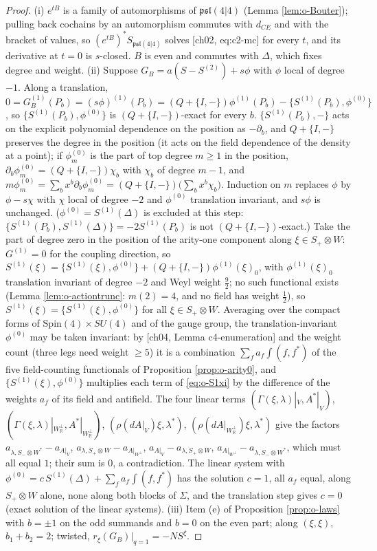 \begin{proof}
(i) $e^{tB}$ is a family of automorphisms of $\mathfrak{psl}(4|4)$ (Lemma \ref{lem:o-Bouter}); pulling back cochains by an automorphism commutes with $d_{CE}$ and with the bracket of values, so $(e^{tB})^*S_{\mathfrak{psl}(4|4)}$ solves [ch02, eq:c2-mc] for every $t$, and its derivative at $t=0$ is $s$-closed. $B$ is even and commutes with $\Delta$, which fixes degree and weight. (ii) Suppose $G_B=a(S-S^{(2)})+s\phi$ with $\phi$ local of degree $-1$. Along a translation, $0=G_B^{(1)}(P_b)=(s\phi)^{(1)}(P_b)=(Q+\{I,-\})\phi^{(1)}(P_b)-\{S^{(1)}(P_b),\phi^{(0)}\}$, so $\{S^{(1)}(P_b),\phi^{(0)}\}$ is $(Q+\{I,-\})$-exact for every $b$. $\{S^{(1)}(P_b),-\}$ acts on the explicit polynomial dependence on the position as $-\partial_b$, and $Q+\{I,-\}$ preserves the degree in the position (it acts on the field dependence of the density at a point); if $\phi^{(0)}_m$ is the part of top degree $m\ge1$ in the position, $\partial_b\phi^{(0)}_m=(Q+\{I,-\})\chi_b$ with $\chi_b$ of degree $m-1$, and $m\phi^{(0)}_m=\sum_bx^b\partial_b\phi^{(0)}_m=(Q+\{I,-\})\big(\sum_bx^b\chi_b\big)$. Induction on $m$ replaces $\phi$ by $\phi-s\chi$ with $\chi$ local of degree $-2$ and $\phi^{(0)}$ translation invariant, and $s\phi$ is unchanged. ($\phi^{(0)}=S^{(1)}(\Delta)$ is excluded at this step: $\{S^{(1)}(P_b),S^{(1)}(\Delta)\}=-2S^{(1)}(P_b)$ is not $(Q+\{I,-\})$-exact.) Take the part of degree zero in the position of the arity-one component along $\xi\in S_+\otimes W$: $G^{(1)}=0$ for the coupling direction, so $S^{(1)}(\xi)=\{S^{(1)}(\xi),\phi^{(0)}\}+(Q+\{I,-\})\phi^{(1)}(\xi)_0$, with $\phi^{(1)}(\xi)_0$ translation invariant of degree $-2$ and Weyl weight $\tfrac92$; no such functional exists (Lemma \ref{lem:o-actiontrunc}: $m(2)=4$, and no field has weight $\tfrac12$), so $S^{(1)}(\xi)=\{S^{(1)}(\xi),\phi^{(0)}\}$ for all $\xi\in S_+\otimes W$. Averaging over the compact forms of $\mathrm{Spin}(4)\times SU(4)$ and of the gauge group, the translation-invariant $\phi^{(0)}$ may be taken invariant: by [ch04, Lemma c4-enumeration] and the weight count (three legs need weight $\ge5$) it is a combination $\sum_fa_f\int(f,f^*)$ of the five field-counting functionals of Proposition \ref{prop:o-arity0}, and $\{S^{(1)}(\xi),\phi^{(0)}\}$ multiplies each term of \eqref{eq:o-S1xi} by the difference of the weights $a_f$ of its field and antifield. The four linear terms $(\Gamma(\xi,\lambda)|_V,A^*|_V)$, $(\Gamma(\xi,\lambda)|_{W_{\mathbb R}^\perp},A^*|_{W_{\mathbb R}^\perp})$, $(\rho(dA|_V)\xi,\lambda^*)$, $(\rho(dA|_{W_{\mathbb R}^\perp})\xi,\lambda^*)$ give the factors $a_{\lambda,S_-\otimes W^*}-a_{A|_V}$, $a_{\lambda,S_+\otimes W}-a_{A|_{W^\perp}}$, $a_{A|_V}-a_{\lambda,S_+\otimes W}$, $a_{A|_{W^\perp}}-a_{\lambda,S_-\otimes W^*}$, which must all equal $1$; their sum is $0$, a contradiction. The linear system with $\phi^{(0)}=c\,S^{(1)}(\Delta)+\sum_fa_f\int(f,f^*)$ has the solution $c=1$, all $a_f$ equal, along $S_+\otimes W$ alone, none along both blocks of $\Sigma$, and the translation step gives $c=0$ (exact solution of the linear systems). (iii) Item (e) of Proposition \ref{prop:o-laws} with $b=\pm1$ on the odd summands and $b=0$ on the even part; along $(\xi,\xi)$, $b_1+b_2=2$; twisted, $r_\xi(G_B)|_{q=1}=-NS^\xi$.
\end{proof}

